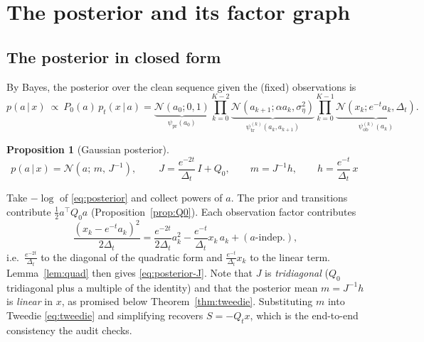 \documentclass[11pt]{article}
\newtheorem{proposition}{Proposition}
\theoremstyle{definition}
\newcommand{\N}{\mathcal{N}}
\newcommand{\Dt}{\Delta_t}
\newcommand{\Qt}{Q_t}
\newcommand{\given}{\,|\,}
\newcommand{\T}{^{\!\top}}
\begin{document}
\section{The posterior and its factor graph}\label{sec:posterior}

\subsection{The posterior in closed form}

By Bayes, the posterior over the clean sequence given the (fixed) observations
is
\begin{equation}\label{eq:posterior}
  p(a\given x)\ \propto\ P_0(a)\,p_t(x\given a)
  =\underbrace{\N(a_0;0,1)}_{\psi_{\mathrm{pr}}(a_0)}
   \prod_{k=0}^{K-2}\underbrace{\N(a_{k+1};\alpha a_k,\sigma_\eta^2)}_{\psi^{(k)}_{\mathrm{tr}}(a_k,a_{k+1})}
   \prod_{k=0}^{K-1}\underbrace{\N(x_k;e^{-t}a_k,\Dt)}_{\psi^{(k)}_{\mathrm{ob}}(a_k)} .
\end{equation}

\begin{proposition}[Gaussian posterior]\label{prop:posteriorJ}
\begin{equation}\label{eq:posterior-J}
  p(a\given x)=\N(a;\,m,\,J^{-1}),\qquad
  \boxed{\ J=\frac{e^{-2t}}{\Dt}\,I+Q_0,\qquad
  m=J^{-1}h,\qquad h=\frac{e^{-t}}{\Dt}\,x\ }
\end{equation}
\end{proposition}

\begin{derivation}
Take $-\log$ of \eqref{eq:posterior} and collect powers of $a$. The prior and
transitions contribute $\tfrac12a\T Q_0a$ (Proposition~\ref{prop:Q0}). Each
observation factor contributes
\[
  \frac{(x_k-e^{-t}a_k)^2}{2\Dt}
  =\frac{e^{-2t}}{2\Dt}a_k^2-\frac{e^{-t}}{\Dt}x_k\,a_k+(\text{$a$-indep.}),
\]
i.e.\ $\tfrac{e^{-2t}}{\Dt}$ to the diagonal of the quadratic form and
$\tfrac{e^{-t}}{\Dt}x_k$ to the linear term. Lemma~\ref{lem:quad} then gives
\eqref{eq:posterior-J}. Note that $J$ is \emph{tridiagonal} ($Q_0$ tridiagonal
plus a multiple of the identity) and that the posterior mean
$m=J^{-1}h$ is \emph{linear} in $x$, as promised below
Theorem~\ref{thm:tweedie}. Substituting $m$ into Tweedie
\eqref{eq:tweedie} and simplifying recovers $S=-\Qt x$, which is the
end-to-end consistency the audit checks.
\end{derivation}
\end{document}
